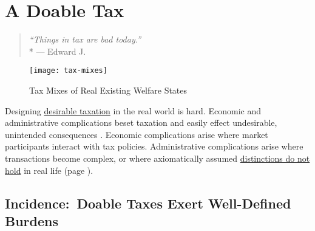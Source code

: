 
\chapter[Doable Tax]{A Doable Tax}\label{chap:doable-tax}



\begin{quote}
	\emph{``Things in tax are bad today.''}
	\\*
	--- Edward J.\ \citet[893]{McCaffery2005}
\end{quote}


 \begin{figure}[htbp]
	\centering
	\texttt{[image: tax-mixes]}
	\caption[Tax Mixes]{Tax Mixes of Real Existing Welfare States}
	\label{fig:tax-mixes}
\end{figure}


Designing \hyperref[sec:Desirability]{desirable taxation} in the real world is hard.
Economic and administrative complications beset taxation and easily effect undesirable, unintended consequences \citep{Merton-1968-aa}.
Economic complications arise where market participants interact with tax policies.
Administrative complications arise where transactions become complex, or where axiomatically assumed \hyperref[sec:WorkPlay]{distinctions do not hold} in real life (page \pageref{sec:WorkPlay}).

\section[Incidence]{Incidence:~Doable Taxes Exert Well-Defined Burdens} \label{sec:tax-incidence}


